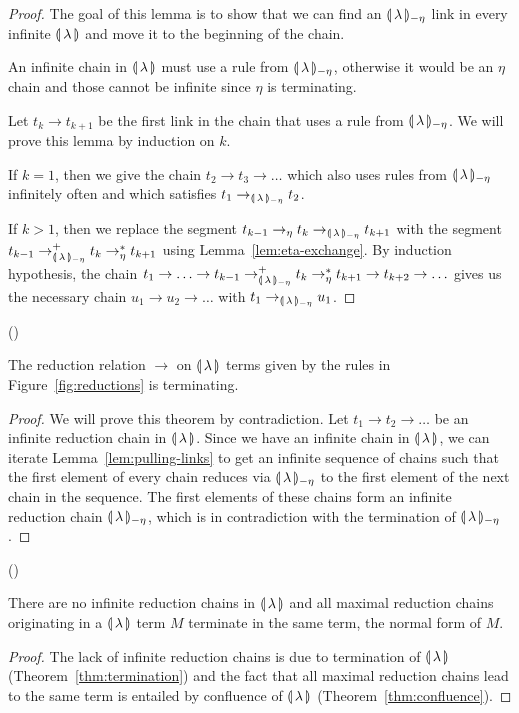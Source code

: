 \begin{proof}
  The goal of this lemma is to show that we can find an ${\llparenthesis \, \lambda \, \rrparenthesis_{-\eta}}$ link in
  every infinite ${\llparenthesis \, \lambda \, \rrparenthesis}$ and move it to the beginning of the chain.

  An infinite chain in ${\llparenthesis \, \lambda \, \rrparenthesis}$ must use a rule from ${\llparenthesis \, \lambda \, \rrparenthesis_{-\eta}}$, otherwise
  it would be an $\eta$ chain and those cannot be infinite since $\eta$ is
  terminating.
  
  Let $t_k \to t_{k+1}$ be the first link in the chain that uses a rule
  from ${\llparenthesis \, \lambda \, \rrparenthesis_{-\eta}}$. We will prove this lemma by induction on $k$.
  
  If $k = 1$, then we give the chain $t_2 \to t_3 \to \ldots$ which also
  uses rules from ${\llparenthesis \, \lambda \, \rrparenthesis_{-\eta}}$ infinitely often and which satisfies
  $t_1 \to_{\llparenthesis \, \lambda \, \rrparenthesis_{-\eta}} t_2$.
  
  If $k > 1$, then we replace the segment
  $t_{k-1} \to_\eta t_k \to_{\llparenthesis \, \lambda \, \rrparenthesis_{-\eta}} t_{k+1}$ with the segment
  $t_{k-1} \to^+_{\llparenthesis \, \lambda \, \rrparenthesis_{-\eta}} t_k \to^*_\eta t_{k+1}$ using
  Lemma~\ref{lem:eta-exchange}. By induction hypothesis, the chain
  $t_1 \to \ldots \to t_{k-1} \to^+_{\llparenthesis \, \lambda \, \rrparenthesis_{-\eta}} t_k \to^*_\eta t_{k+1} \to
  t_{k+2} \to \ldots$ gives us the necessary chain $u_1 \to u_2 \to \ldots$
  with $t_1 \to_{\llparenthesis \, \lambda \, \rrparenthesis_{-\eta}} u_1$.
\end{proof}

\begin{theorem}\label{thm:termination}
  ()
  
  The reduction relation $\to$ on $\llparenthesis \, \lambda \, \rrparenthesis$ terms given by the
  rules in Figure~\ref{fig:reductions} is terminating.
\end{theorem}

\begin{proof}
  We will prove this theorem by contradiction. Let $t_1 \to t_2 \to \ldots$
  be an infinite reduction chain in ${\llparenthesis \, \lambda \, \rrparenthesis}$. Since we have an infinite
  chain in ${\llparenthesis \, \lambda \, \rrparenthesis}$, we can iterate Lemma~\ref{lem:pulling-links} to get an
  infinite sequence of chains such that the first element of every chain
  reduces via ${\llparenthesis \, \lambda \, \rrparenthesis_{-\eta}}$ to the first element of the next chain in the
  sequence. The first elements of these chains form an infinite reduction
  chain ${\llparenthesis \, \lambda \, \rrparenthesis_{-\eta}}$, which is in contradiction with the termination of
  ${\llparenthesis \, \lambda \, \rrparenthesis_{-\eta}}$.
\end{proof}

\begin{theorem}\label{thm:strong-normalization}
  ()
  
  There are no infinite reduction chains in ${\llparenthesis \, \lambda \, \rrparenthesis}$ and all maximal
  reduction chains originating in a ${\llparenthesis \, \lambda \, \rrparenthesis}$ term $M$ terminate in the same
  term, the normal form of $M$.
\end{theorem}

\begin{proof}
  The lack of infinite reduction chains is due to termination of ${\llparenthesis \, \lambda \, \rrparenthesis}$
  (Theorem~\ref{thm:termination}) and the fact that all maximal reduction
  chains lead to the same term is entailed by confluence of ${\llparenthesis \, \lambda \, \rrparenthesis}$
  (Theorem~\ref{thm:confluence}).
\end{proof}
